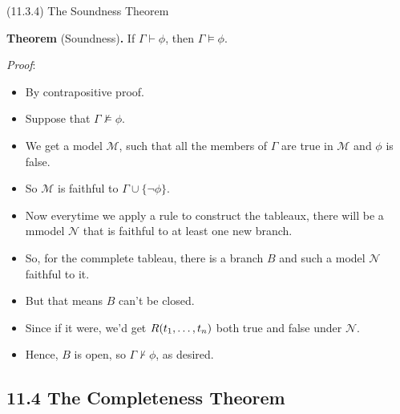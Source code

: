 \begin{frame}{(11.3.4) The Soundness Theorem}

\textbf{Theorem} (Soundness)\textbf{.} If $\Gamma\vdash\phi$, then
$\Gamma\vDash\phi$.

\emph{Proof}:

\begin{itemize}
\item By contrapositive proof.
\item Suppose that $\Gamma\nvDash\phi$.
  \item We get a model $\mathcal{M}$, such that all the members of
    $\Gamma$ are true in $\mathcal{M}$ and $\phi$ is false.
  \item So $\mathcal{M}$ is faithful to $\Gamma\cup\{\neg\phi\}$.
    \item Now everytime we apply a rule to construct the tableaux,
      there will be a mmodel $\mathcal{N}$ that is faithful to at
      least one new branch.
      \item So, for the commplete tableau, there is a branch $B$ and
        such a model 
        $\mathcal{N}$ faithful to it.

      \item But that means $B$ can't be closed.
        \item Since if it were, we'd get $R(t_1, \mathellipsis, t_n)$
          both true and false under $\mathcal{N}$.
          \item Hence, $B$ is open, so $\Gamma\nvdash\phi$, as desired.
\end{itemize}
  
\end{frame}

\subsection{11.4 The Completeness Theorem}

